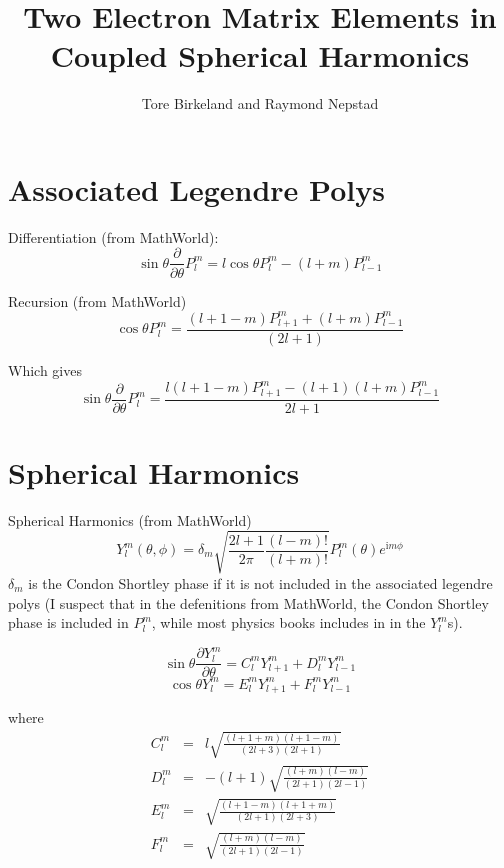 \documentclass[a4paper,12pt]{paper}
\title{Two Electron Matrix Elements in Coupled Spherical Harmonics}
\author{Tore Birkeland and Raymond Nepstad}
\renewcommand{\imath}{{\mathrm i}}
\newcommand{\partialdiff}[2]{\frac{\partial #1}{\partial #2}}
\begin{document}
\section{Associated Legendre Polys}

Differentiation (from MathWorld):
\begin{equation}
	\sin \theta \partialdiff{}{\theta} P_l^m = l \cos \theta P_l^m - (l+m)
P_{l-1}^m
\end{equation}

Recursion (from MathWorld)
\begin{equation}
	\cos \theta P_l^m = \frac{ (l+1-m) P_{l+1}^m + (l+m) P_{l-1}^m }{ (2 l +
1) }
\end{equation}

Which gives
\begin{equation}
	\sin \theta \partialdiff{}{\theta} P_l^m = \frac{l(l+1-m) P_{l+1}^m 
- (l+1)(l+m) P_{l-1}^m}{2l + 1} 
\end{equation}


\section{Spherical Harmonics}

Spherical Harmonics (from MathWorld)
\begin{equation}
	\label{eqn:spherical-harmonics}
	Y_l^m(\theta, \phi) = \delta_m \sqrt{ \frac{2l + 1}{2 \pi}
\frac{(l-m)!}{(l+m)!} } P_l^m(\theta) e^{\imath m \phi}
\end{equation}
$\delta_m$ is the Condon Shortley phase if it is not included in the associated
legendre polys (I suspect that in the defenitions from MathWorld, the Condon
Shortley phase is included in $P_l^m$, while most physics books includes in in
the $Y_l^m$s).

\begin{equation}
	\sin \theta \partialdiff{Y_l^m}{\theta} = C_l^m Y_{l+1}^m
+ D_l^m Y_{l-1}^m
\end{equation}
\begin{equation}
 	\cos \theta Y_l^m = E_l^m Y_{l+1}^m + F_l^m Y_{l-1}^m
\end{equation}

where
\begin{eqnarray}
	C_l^m &=& l \sqrt{ \frac{(l+1+m)(l+1-m)}{(2l + 3)(2l + 1)}} \\
	D_l^m &=& - (l+1) \sqrt{ \frac{(l+m)(l-m)}{(2l + 1)(2l - 1)} } \\
	E_l^m &=& \sqrt{ \frac{(l+1-m)(l+1+m)}{(2l+1)(2l+3)} } \\
	F_l^m &=& \sqrt{ \frac{(l+m)(l-m)}{(2l+1)(2l-1)} }
\end{eqnarray}
\end{document}
